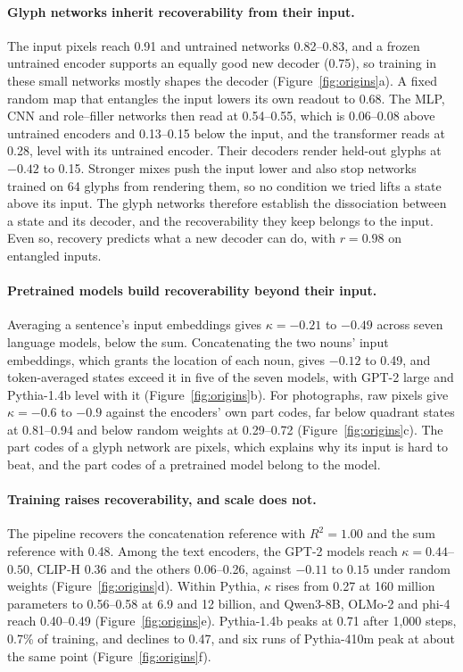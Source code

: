 \paragraph{Glyph networks inherit recoverability from their input.} The input pixels reach 0.91 and untrained networks 0.82--0.83, and a frozen untrained encoder supports an equally good new decoder (0.75), so training in these small networks mostly shapes the decoder (Figure~\ref{fig:origins}a). A fixed random map that entangles the input lowers its own readout to 0.68. The MLP, CNN and role--filler networks then read at 0.54--0.55, which is 0.06--0.08 above untrained encoders and 0.13--0.15 below the input, and the transformer reads at 0.28, level with its untrained encoder. Their decoders render held-out glyphs at $-0.42$ to 0.15. Stronger mixes push the input lower and also stop networks trained on 64 glyphs from rendering them, so no condition we tried lifts a state above its input. The glyph networks therefore establish the dissociation between a state and its decoder, and the recoverability they keep belongs to the input. Even so, recovery predicts what a new decoder can do, with $r = 0.98$ on entangled inputs.

\paragraph{Pretrained models build recoverability beyond their input.} Averaging a sentence's input embeddings gives $\kappa = -0.21$ to $-0.49$ across seven language models, below the sum. Concatenating the two nouns' input embeddings, which grants the location of each noun, gives $-0.12$ to 0.49, and token-averaged states exceed it in five of the seven models, with GPT-2 large and Pythia-1.4b level with it (Figure~\ref{fig:origins}b). For photographs, raw pixels give $\kappa = -0.6$ to $-0.9$ against the encoders' own part codes, far below quadrant states at 0.81--0.94 and below random weights at 0.29--0.72 (Figure~\ref{fig:origins}c). The part codes of a glyph network are pixels, which explains why its input is hard to beat, and the part codes of a pretrained model belong to the model.

\paragraph{Training raises recoverability, and scale does not.} The pipeline recovers the concatenation reference with $R^2 = 1.00$ and the sum reference with 0.48. Among the text encoders, the GPT-2 models reach $\kappa = 0.44$--$0.50$, CLIP-H 0.36 and the others 0.06--0.26, against $-0.11$ to $0.15$ under random weights (Figure~\ref{fig:origins}d). Within Pythia, $\kappa$ rises from 0.27 at 160 million parameters to 0.56--0.58 at 6.9 and 12 billion, and Qwen3-8B, OLMo-2 and phi-4 reach 0.40--0.49 (Figure~\ref{fig:origins}e). Pythia-1.4b peaks at 0.71 after 1{,}000 steps, 0.7\% of training, and declines to 0.47, and six runs of Pythia-410m peak at about the same point (Figure~\ref{fig:origins}f).

